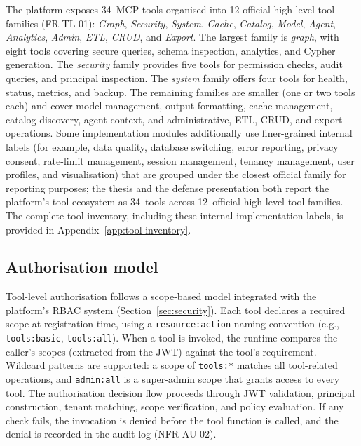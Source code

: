 \documentclass[a4paper,noexaminfo]{sapthesis}
\newcommand{\CategoryCount}{12}
\begin{document}
The platform exposes 34~MCP tools organised into \CategoryCount{} official
high-level tool families (FR-TL-01): \emph{Graph}, \emph{Security},
\emph{System}, \emph{Cache}, \emph{Catalog}, \emph{Model}, \emph{Agent},
\emph{Analytics}, \emph{Admin}, \emph{ETL}, \emph{CRUD}, and \emph{Export}.
The largest family is \emph{graph}, with eight
tools covering secure queries, schema inspection, analytics, and Cypher
generation.  The \emph{security} family provides five tools for
permission checks, audit queries, and principal inspection.  The
\emph{system} family offers four tools for health, status, metrics, and
backup.  The remaining families are smaller (one or two tools each) and
cover model management, output formatting, cache management, catalog
discovery, agent context, and administrative, ETL, CRUD, and export
operations.  Some implementation modules additionally use finer-grained
internal labels (for example, data quality, database switching, error
reporting, privacy consent, rate-limit management, session management,
tenancy management, user profiles, and visualisation) that are grouped
under the closest official family for reporting purposes; the thesis and
the defense presentation both report the platform's tool ecosystem as
34~tools across 12~official high-level tool families.  The complete tool
inventory, including these internal implementation labels, is provided in
Appendix~\ref{app:tool-inventory}.

\subsection{Authorisation model}

Tool-level authorisation follows a scope-based model integrated with the
platform's RBAC system (Section~\ref{sec:security}).  Each tool declares
a required scope at registration time, using a \texttt{resource:action}
naming convention (e.g., \texttt{tools:basic}, \texttt{tools:all}).
When a tool is invoked, the runtime compares the caller's scopes (extracted
from the JWT) against the tool's requirement.  Wildcard patterns are
supported: a scope of \texttt{tools:*} matches all tool-related
operations, and \texttt{admin:all} is a super-admin scope that grants
access to every tool.  The authorisation decision flow proceeds through
JWT validation, principal construction, tenant matching, scope
verification, and policy evaluation.  If any check fails, the invocation
is denied before the tool function is called, and the denial is recorded
in the audit log (NFR-AU-02).
\end{document}
